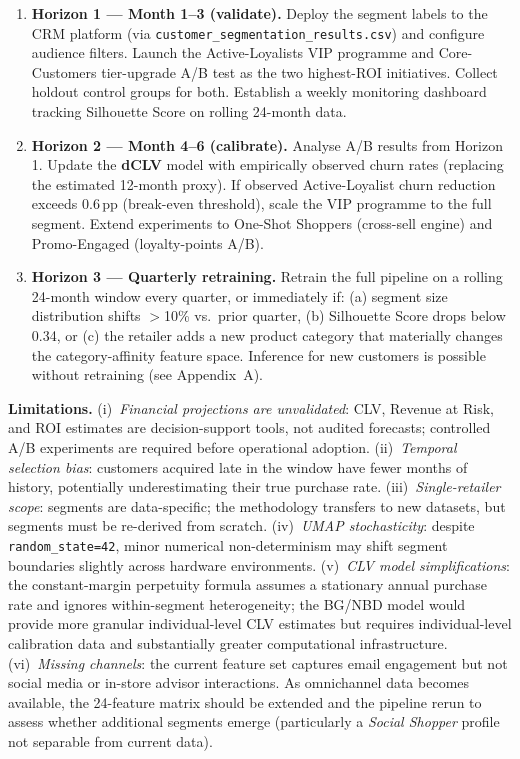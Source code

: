 \documentclass[10pt,a4paper]{article}
\begin{document}
\begin{enumerate}[topsep=2pt, itemsep=3pt]
  \item \textbf{Horizon 1 --- Month 1--3 (validate).}
    Deploy the segment labels to the CRM platform (via
    \texttt{customer\_segmentation\_results.csv}) and configure audience filters.
    Launch the Active-Loyalists VIP programme and Core-Customers tier-upgrade A/B
    test as the two highest-ROI initiatives. Collect holdout control groups for both.
    Establish a weekly monitoring dashboard tracking Silhouette Score on rolling
    24-month data.
  \item \textbf{Horizon 2 --- Month 4--6 (calibrate).}
    Analyse A/B results from Horizon 1. Update the \textbf{dCLV} model with
    empirically observed churn rates (replacing the estimated 12-month proxy).
    If observed Active-Loyalist churn reduction exceeds 0.6\,pp (break-even threshold),
    scale the VIP programme to the full segment. Extend experiments to One-Shot
    Shoppers (cross-sell engine) and Promo-Engaged (loyalty-points A/B).
  \item \textbf{Horizon 3 --- Quarterly retraining.}
    Retrain the full pipeline on a rolling 24-month window every quarter, or
    immediately if: (a) segment size distribution shifts $>$10\% vs.\ prior quarter,
    (b) Silhouette Score drops below 0.34, or (c) the retailer adds a new product
    category that materially changes the category-affinity feature space.
    Inference for new customers is possible without retraining (see Appendix~A).
\end{enumerate}

\textbf{Limitations.}
(i)~\textit{Financial projections are unvalidated}: CLV, Revenue at Risk, and ROI
estimates are decision-support tools, not audited forecasts; controlled A/B experiments
are required before operational adoption.
(ii)~\textit{Temporal selection bias}: customers acquired late in the window have fewer
months of history, potentially underestimating their true purchase rate.
(iii)~\textit{Single-retailer scope}: segments are data-specific; the methodology
transfers to new datasets, but segments must be re-derived from scratch.
(iv)~\textit{UMAP stochasticity}: despite \texttt{random\_state=42}, minor numerical
non-determinism may shift segment boundaries slightly across hardware environments.
(v)~\textit{CLV model simplifications}: the constant-margin perpetuity formula assumes
a stationary annual purchase rate and ignores within-segment heterogeneity; the
BG/NBD model \cite{fader2005counting} would provide more granular individual-level
CLV estimates but requires individual-level calibration data and substantially
greater computational infrastructure.
(vi)~\textit{Missing channels}: the current feature set captures email engagement
but not social media or in-store advisor interactions. As omnichannel data becomes
available, the 24-feature matrix should be extended and the pipeline rerun to
assess whether additional segments emerge (particularly a \textit{Social Shopper}
profile not separable from current data).
\end{document}
